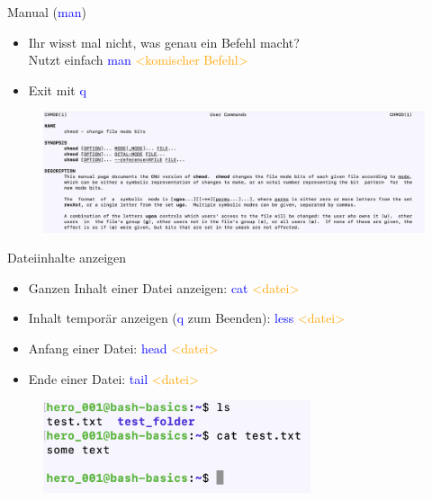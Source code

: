 \documentclass[t, xcolor=dvipsnames]{beamer}
\begin{document}
\begin{frame}{Manual (\textcolor{blue}{man})}
    \begin{itemize}
        \item Ihr wisst mal nicht, was genau ein Befehl macht? \\ Nutzt einfach \textcolor{blue}{man} \textcolor{orange}{<komischer Befehl>}
        \item Exit mit \textcolor{blue}{q}
    \end{itemize}
    
    \begin{figure}
        \centering
        \includegraphics[width=1\textwidth]{graphics/man}
    \end{figure}
\end{frame}

\begin{frame}{Dateiinhalte anzeigen}
    \begin{itemize}
        \item Ganzen Inhalt einer Datei anzeigen: \textcolor{blue}{cat} \textcolor{orange}{<datei>}
        \item Inhalt temporär anzeigen (\textcolor{blue}{q} zum Beenden): \textcolor{blue}{less} \textcolor{orange}{<datei>}
        \item Anfang einer Datei: \textcolor{blue}{head} \textcolor{orange}{<datei>}
        \item Ende einer Datei: \textcolor{blue}{tail} \textcolor{orange}{<datei>}
    \end{itemize}
    
    \begin{figure}
        \centering
        \includegraphics[width=0.7\textwidth]{graphics/cat}
    \end{figure}
\end{frame}
\end{document}
